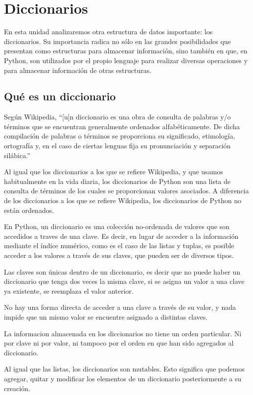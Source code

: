 \chapter{Diccionarios}

En esta unidad analizaremos otra estructura de datos importante: los diccionarios.
Su importancia radica no sólo en las grandes posibilidades que presentan
como estructuras para almacenar información, sino también en que, en
Python, son utilizados por el propio lenguaje para realizar diversas
operaciones y para almacenar información de otras estructuras.

\section{Qué es un diccionario}

Según Wikipedia, ``[u]n diccionario es una obra de consulta de
palabras y/o términos que se encuentran generalmente ordenados
alfabéticamente. De dicha compilación de palabras o términos se
proporciona su significado, etimología, ortografía y, en el caso
de ciertas lenguas fija su pronunciación y separación silábica.''


Al igual que los diccionarios a los que se refiere Wikipedia, y
que usamos habitualmente en la vida diaria, los diccionarios de
Python son una lista de consulta de términos de los cuales se
proporcionan valores asociados. A diferencia de los diccionarios a
los que se refiere Wikipedia, los diccionarios de Python no están
ordenados.


En Python, un diccionario es una colección no-ordenada de valores
que son accedidos a traves de una clave.  Es decir, en lugar de
acceder a la información mediante el índice numérico, como es el
caso de las listas y tuplas, es posible acceder a los valores a
través de sus claves, que pueden ser de diversos tipos.

Las claves son únicas dentro de un diccionario, es decir que no puede haber
un diccionario que tenga dos veces la misma clave, si se asigna un valor a
una clave ya existente, se reemplaza el valor anterior.

No hay una forma directa de acceder a una clave a través de su valor, y
nada impide que un mismo valor se encuentre asignado a distintas claves.

La informacion almacenada en los diccionarios no tiene un orden
particular.  Ni por clave ni por valor, ni tampoco por el orden en
que han sido agregados al diccionario.

Al igual que las listas, los diccionarios son mutables. Esto significa que
podemos agregar, quitar y modificar los elementos de un diccionario
posteriormente a su creación.

